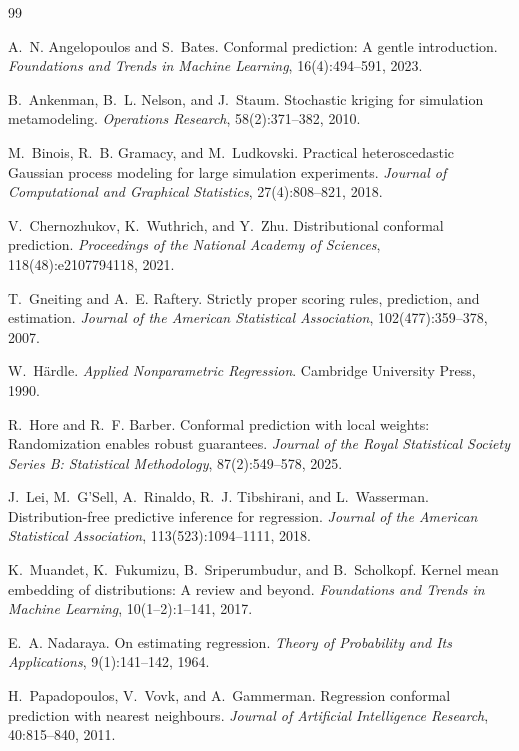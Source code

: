 \documentclass[11pt]{article}
\begin{document}
\begin{thebibliography}{99}

A.~N. Angelopoulos and S.~Bates.
\newblock Conformal prediction: A gentle introduction.
\newblock \emph{Foundations and Trends in Machine Learning}, 16(4):494--591, 2023.

B.~Ankenman, B.~L. Nelson, and J.~Staum.
\newblock Stochastic kriging for simulation metamodeling.
\newblock \emph{Operations Research}, 58(2):371--382, 2010.

M.~Binois, R.~B. Gramacy, and M.~Ludkovski.
\newblock Practical heteroscedastic Gaussian process modeling for large simulation experiments.
\newblock \emph{Journal of Computational and Graphical Statistics}, 27(4):808--821, 2018.

V.~Chernozhukov, K.~Wuthrich, and Y.~Zhu.
\newblock Distributional conformal prediction.
\newblock \emph{Proceedings of the National Academy of Sciences}, 118(48):e2107794118, 2021.

T.~Gneiting and A.~E. Raftery.
\newblock Strictly proper scoring rules, prediction, and estimation.
\newblock \emph{Journal of the American Statistical Association}, 102(477):359--378, 2007.

W.~H\"ardle.
\newblock \emph{Applied Nonparametric Regression}.
\newblock Cambridge University Press, 1990.

R.~Hore and R.~F. Barber.
\newblock Conformal prediction with local weights: Randomization enables robust guarantees.
\newblock \emph{Journal of the Royal Statistical Society Series B: Statistical Methodology}, 87(2):549--578, 2025.

J.~Lei, M.~G'Sell, A.~Rinaldo, R.~J. Tibshirani, and L.~Wasserman.
\newblock Distribution-free predictive inference for regression.
\newblock \emph{Journal of the American Statistical Association}, 113(523):1094--1111, 2018.

K.~Muandet, K.~Fukumizu, B.~Sriperumbudur, and B.~Scholkopf.
\newblock Kernel mean embedding of distributions: A review and beyond.
\newblock \emph{Foundations and Trends in Machine Learning}, 10(1--2):1--141, 2017.

E.~A. Nadaraya.
\newblock On estimating regression.
\newblock \emph{Theory of Probability and Its Applications}, 9(1):141--142, 1964.

H.~Papadopoulos, V.~Vovk, and A.~Gammerman.
\newblock Regression conformal prediction with nearest neighbours.
\newblock \emph{Journal of Artificial Intelligence Research}, 40:815--840, 2011.


\end{thebibliography}
\end{document}

